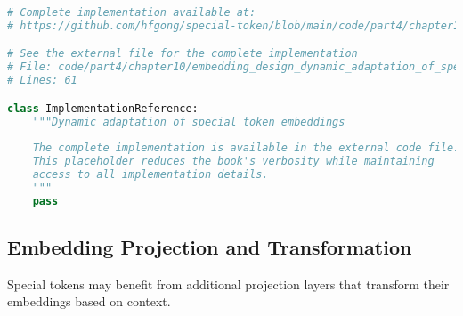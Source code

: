 \begin{lstlisting}[language=Python, caption={Dynamic adaptation of special token embeddings}]
# Complete implementation available at:
# https://github.com/hfgong/special-token/blob/main/code/part4/chapter10/embedding_design_dynamic_adaptation_of_special_.py

# See the external file for the complete implementation
# File: code/part4/chapter10/embedding_design_dynamic_adaptation_of_special_.py
# Lines: 61

class ImplementationReference:
    """Dynamic adaptation of special token embeddings
    
    The complete implementation is available in the external code file.
    This placeholder reduces the book's verbosity while maintaining
    access to all implementation details.
    """
    pass
\end{lstlisting}

\subsection{Embedding Projection and Transformation}

Special tokens may benefit from additional projection layers that transform their embeddings based on context.

